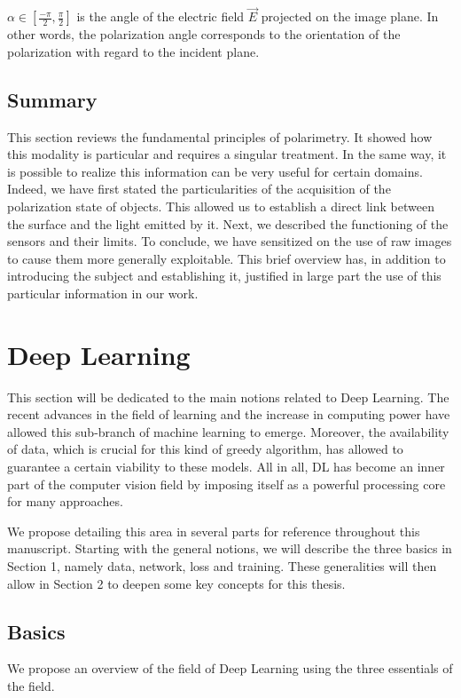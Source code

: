 $\alpha \in \left[\frac{-\pi}{2}, \frac{\pi}{2}\right]$ is the angle of the electric field $\vec{E}$ projected on the image plane. In other words, the polarization angle corresponds to the orientation of the polarization with regard to the incident plane.

\subsection{Summary}

This section reviews the fundamental principles of polarimetry. It showed how this modality is particular and requires a singular treatment. In the same way, it is possible to realize this information can be very useful for certain domains. Indeed, we have first stated the particularities of the acquisition of the polarization state of objects. This allowed us to establish a direct link between the surface and the light emitted by it. Next, we described the functioning of the sensors and their limits. To conclude, we have sensitized on the use of raw images to cause them more generally exploitable. This brief overview has, in addition to introducing the subject and establishing it, justified in large part the use of this particular information in our work.





\section{Deep Learning}\label{DL_explain}

This section will be dedicated to the main notions related to Deep Learning. The recent advances in the field of learning and the increase in computing power have allowed this sub-branch of machine learning to emerge. Moreover, the availability of data, which is crucial for this kind of greedy algorithm, has allowed to guarantee a certain viability to these models. All in all, DL has become an inner part of the computer vision field by imposing itself as a powerful processing core for many approaches.

We propose detailing this area in several parts for reference throughout this manuscript. Starting with the general notions, we will describe the three basics in Section 1, namely data, network, loss and training.
These generalities will then allow in Section 2 to deepen some key concepts for this thesis.

\subsection{Basics}
We propose an overview of the field of Deep Learning using the three essentials of the field.

